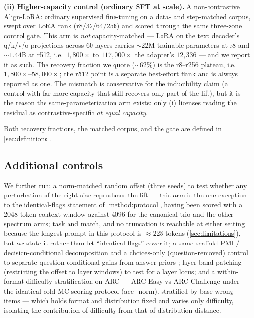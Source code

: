 \textbf{(ii) Higher-capacity control (ordinary SFT at scale).} A non-contrastive
Align-LoRA: ordinary supervised fine-tuning on a data- and step-matched corpus,
swept over LoRA rank (r8/32/64/256) and scored through the same three-zone control
gate. This arm is \emph{not} capacity-matched --- LoRA on the text decoder's
q/k/v/o projections across 60 layers carries ${\sim}22$M trainable parameters at r8
and ${\sim}1.44$B at r512, i.e.\ $1{,}800\times$ to $117{,}000\times$ the adapter's
$12{,}336$ --- and we report it as such. The recovery fraction we quote
(${\sim}62\%$) is the r8--r256 plateau, i.e.\ $1{,}800\times$--$58{,}000\times$; the
r512 point is a separate best-effort flank and is always reported as one. The mismatch is conservative for the
inducibility claim (a control with far more capacity that still recovers only part of
the lift), but it is the reason the same-parameterization arm exists: only (i)
licenses reading the residual as contrastive-specific \emph{at equal capacity}.

Both recovery fractions, the matched corpus, and the gate are defined in
\cref{sec:definitions}.

\subsection{Additional controls}\label{method:controls}

We further run: a norm-matched random offset (three seeds) to test whether any
perturbation of the right size reproduces the lift --- this arm is the one exception
to the identical-flags statement of \cref{method:protocol}, having been scored with a
2048-token context window against 4096 for the canonical trio and the other spectrum
arms; task and  match, and no truncation is
reachable at either setting because the longest prompt in this protocol is
${\approx}228$ tokens (\cref{sec:limitations}), but we state it rather than let
``identical flags'' cover it; a same-scaffold PMI /
decision-conditional decomposition and a choices-only (question-removed) control to
separate question-conditional gains from answer priors
\citep{SurfaceFormCompetition}; layer-band patching (restricting the offset to layer
windows) to test for a layer locus; and a within-format difficulty stratification on
ARC --- ARC-Easy vs ARC-Challenge under the identical cold-MC scoring protocol
(acc\_norm), stratified by base-wrong items --- which holds format and distribution
fixed and varies only difficulty, isolating the contribution of difficulty from that
of distribution distance.


